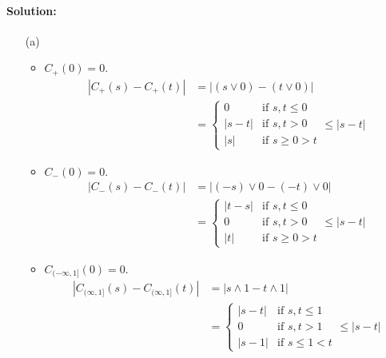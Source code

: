 \paragraph{Solution:}
\begin{itemize}
	\item [(a)]
		\begin{itemize}
			\item 
				$C_{+}(0) = 0$.\\
				\begin{equation*}
					\begin{aligned}
						\left|C_{+}(s) - C_{+}(t)\right| &= \left|(s\vee 0) - (t\vee 0)\right|\\
						&=
						\begin{cases}
							0 &\text{if }s,t\leq 0\\
							|s - t| &\text{if }s,t>0\\
							|s| &\text{if }s\geq 0>t
						\end{cases} \leq |s - t|
					\end{aligned}
				\end{equation*}
			\item 
				$C_{-}(0) = 0$.\\
				\begin{equation*}
					\begin{aligned}
						|C_{-}(s) - C_{-}(t)| &= |(-s)\vee 0 - (-t)\vee 0|\\
						&=
						\begin{cases}
							|t - s| &\text{if }s,t\leq 0\\
							0 &\text{if }s,t>0\\
							|t| &\text{if }s\geq 0>t
						\end{cases} \leq |s - t|
					\end{aligned}
				\end{equation*}
			\item 
				$C_{(-\infty,1]}(0) = 0$.\\
				\begin{equation*}
					\begin{aligned}
						|C_{(\infty,1]}(s) - C_{(\infty,1]}(t)| &= |s\wedge 1 - t\wedge 1|\\
						&=
						\begin{cases}
							|s - t| &\text{if }s,t\leq 1\\
							0 &\text{if }s,t>1\\
							|s - 1| &\text{if }s\leq 1<t
						\end{cases} \leq |s - t|
					\end{aligned}

\end{equation*}
\end{itemize}
\end{itemize}
